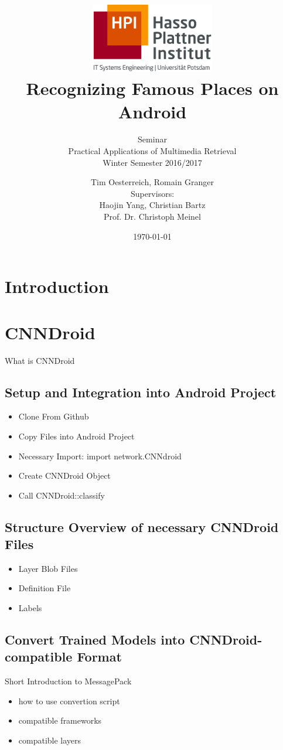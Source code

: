 \documentclass[a4paper,12pt,pagesize,headsepline,bibtotoc,titlepage]{scrartcl}
\title{
    \includegraphics*[width=0.4\textwidth]{hpi_logo.png}\\
    \vspace{24pt}
    Recognizing Famous Places on Android
}
\subtitle{
    Seminar\\
    Practical Applications of Multimedia Retrieval\\
    Winter Semester 2016/2017
}
\author{
    Tim Oesterreich, Romain Granger\\[12pt]
    Supervisors:\\
    Haojin Yang, Christian Bartz\\
    Prof. Dr. Christoph Meinel
}
\date{\today}
\begin{document}
\maketitle
\tableofcontents
\newpage

\section{Introduction}
\section{CNNDroid}
What is CNNDroid

\subsection{Setup and Integration into Android Project}
\begin{itemize}
    \item{Clone From Github}
    \item{Copy Files into Android Project}
    \item{Necessary Import: import network.CNNdroid}
    \item{Create CNNDroid Object}
    \item{Call CNNDroid::classify}
\end{itemize}

\subsection{Structure Overview of necessary CNNDroid Files}
\begin{itemize}
    \item{Layer Blob Files}
    \item{Definition File}
    \item{Labels}
\end{itemize}

\subsection{Convert Trained Models into CNNDroid-compatible Format}
Short Introduction to MessagePack
\begin{itemize}
    \item{how to use convertion script}
    \item{compatible frameworks}
    \item{compatible layers}
\end{itemize}
\end{document}
